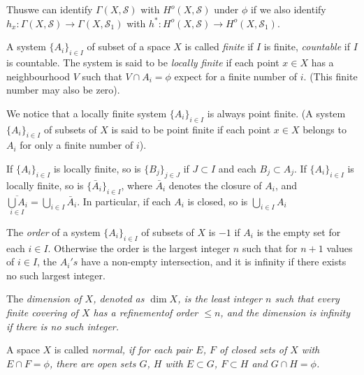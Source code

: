 Thus\pageoriginale we can identify $\Gamma (X, \mathscr{S})$ with
$H^o(X,\mathscr{S})$ under $\phi$ if we also identify $h_x:\Gamma
(X,\mathscr{S}) \to \Gamma (X,\mathscr{S}_1)$ with $h^* : H^o (X,
\mathscr{S}) \to H^o (X, \mathscr{S}_1)$. 

\begin{defi*}%
A system $\big\{ A_i \big\}_{i \in I}$ of subset of a space $X$ is
called \textit{finite}
if $I$ is finite, \textit{countable} if $I$ is countable. The system
is said to be \textit{locally finite} if each point $x \in X$ has a
neighbourhood $V$ such that $V \cap A_i= \phi$ expect for a finite
number of $i$. (This finite number may also be zero). 
\end{defi*}

We notice that a locally finite system $\big\{ A_i \big\}_{i \in I}$ is always
point finite. (A system $\big\{ A_i \big\}_{i \in I}$ of subsets of $X$ is said
to be point finite if each point $x \in X$ belongs to $A_i$ for only a
finite number of $i$). 

If $\big\{ A_i \big\}_{i \in I}$ is locally finite, so is $\big\{ B_j
\big\}_{j \in J}$ if 
$J \subset I$ and each $B_j \subset A_j$. If $\big\{ A_i \big\}_{i \in I}$ is
locally finite, so is $\big\{ \bar{A}_i \big\}_{i \in I}$, where $\bar{A}_i$
denotes the closure of $A_i$, and  $ \underset{i \in I}{\overline
  {\bigcup A_i}}= \bigcup\limits_{i \in I} \bar{A}_i$. In particular, if
each $A_i$ is closed, so is $\bigcup\limits_{i \in I} A_i$ 

\begin{defi*}
The  {\em order} of a system $\{ A_i \}_{i \in I}$ of subsets of $X$
is $-1$ if $A_i$ is the empty set for each $i \in I$. Otherwise the
order is the largest integer $n$ such that for $n+1$ values of $i \in
I$, the $A_i's$ have a non-empty intersection, and it is infinity if
there exists no such largest integer. 
\end{defi*}

\begin{defi*}
The \em{dimension} of $X$, denoted as $\dim X$, is the least integer
$n$ such that every finite covering of $X$ has a
refinement\pageoriginale of order $\le n$, and the dimension is
infinity if there is no such integer. 
\end{defi*}

\begin{defi*}
A space $X$ is called \em{normal}, if for each pair $E$, $F$ of closed
sets of $X$ with $E \cap F= \phi$, there are open sets $G$, $H$ with $E
\subset G$, $F \subset H$ and $G \cap H = \phi$. 
\end{defi*}

